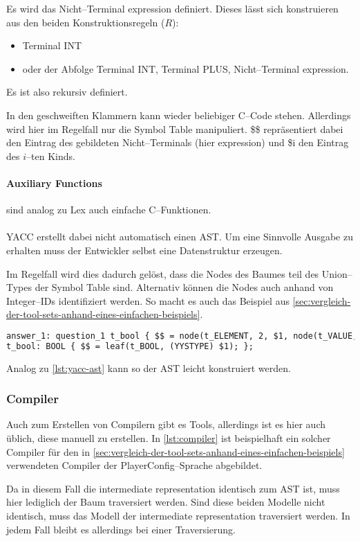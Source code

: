 Es wird das Nicht--Terminal {\ttfamily expression} definiert.
Dieses lässt sich konstruieren aus den beiden Konstruktionsregeln ($R$):
\begin{itemize}
    \item Terminal {\ttfamily INT}
    \item oder der Abfolge Terminal {\ttfamily INT}, Terminal {\ttfamily PLUS}, Nicht--Terminal {\ttfamily expression}.
\end{itemize}
Es ist also rekursiv definiert.

In den geschweiften Klammern kann wieder beliebiger C--Code stehen.
Allerdings wird hier im Regelfall nur die Symbol Table manipuliert.
{\ttfamily \$\$} repräsentiert dabei den Eintrag des gebildeten Nicht--Terminals (hier {\ttfamily expression}) und {\ttfamily \$i} den Eintrag des $i$--ten Kinds.

\paragraph{Auxiliary Functions} sind analog zu Lex auch einfache C--Funktionen.

\paragraph*{}
\ac{YACC} erstellt dabei nicht automatisch einen \ac{AST}.
Um eine Sinnvolle Ausgabe zu erhalten muss der Entwickler selbst eine Datenstruktur erzeugen.

Im Regelfall wird dies dadurch gelöst, dass die Nodes des Baumes teil des Union--Types der Symbol Table sind.
Alternativ können die Nodes auch anhand von Integer--IDs identifiziert werden.
So macht es auch das Beispiel aus \autoref{sec:vergleich-der-tool-sets-anhand-eines-einfachen-beispiels}.
\begin{lstlisting}[label={lst:yacc-ast},caption={\acs{YACC} \acs{AST}},language=yacc]
answer_1: question_1 t_bool { $$ = node(t_ELEMENT, 2, $1, node(t_VALUE, 1, $2)); };
t_bool: BOOL { $$ = leaf(t_BOOL, (YYSTYPE) $1); };
\end{lstlisting}
Analog zu \autoref{lst:yacc-ast} kann so der \ac{AST} leicht konstruiert werden.

\subsubsection{Compiler}
Auch zum Erstellen von Compilern gibt es Tools, allerdings ist es hier auch üblich, diese manuell zu erstellen.
In \autoref{lst:compiler} ist beispielhaft ein solcher Compiler für den in \autoref{sec:vergleich-der-tool-sets-anhand-eines-einfachen-beispiels} verwendeten Compiler der PlayerConfig--Sprache abgebildet.

Da in diesem Fall die intermediate representation identisch zum \ac{AST} ist, muss hier lediglich der Baum traversiert werden.
Sind diese beiden Modelle nicht identisch, muss das Modell der intermediate representation traversiert werden.
In jedem Fall bleibt es allerdings bei einer Traversierung.

